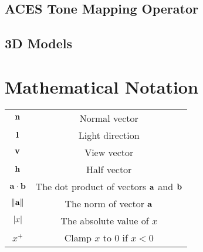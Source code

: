 \begin{appendices}
\section{ACES Tone Mapping Operator}

\section{3D Models}


%
%
\chapter{Mathematical Notation}

\begin{center}
	\begin{tabular}{ c c }
		\hline
		\begin{math}\mathbf{n}\end{math} & Normal vector \\
		\begin{math}\mathbf{l}\end{math} & Light direction \\
		\begin{math}\mathbf{v}\end{math} & View vector \\
		\begin{math}\mathbf{h}\end{math} & Half vector \\
		\begin{math}\mathbf{a}\cdot\mathbf{b}\end{math} & The dot product of vectors \begin{math}\mathbf{a}\end{math} and \begin{math}\mathbf{b}\end{math} \\
		\begin{math}\norm{\mathbf{a}}\end{math} & The norm of vector \begin{math}\mathbf{a}\end{math} \\
		\begin{math}\abs{x}\end{math} & The absolute value of \begin{math}x\end{math} \\
		\begin{math}x^+\end{math} & Clamp \begin{math}x\end{math} to \begin{math}0\end{math} if \begin{math}x<0\end{math} \\

\end{tabular}
\end{center}
\end{appendices}
